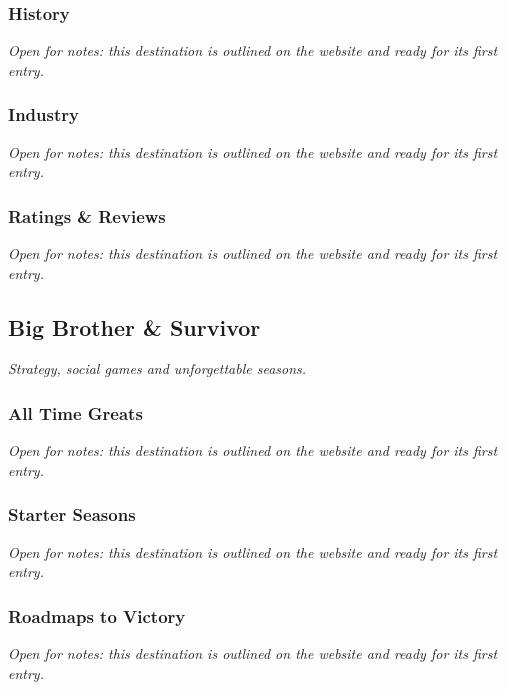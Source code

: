 \documentclass{article}
\begin{document}
\subsubsection{History}\label{sec:gaming-history}
\textit{Open for notes: this destination is outlined on the website and ready for its first entry.}

\subsubsection{Industry}\label{sec:industry}
\textit{Open for notes: this destination is outlined on the website and ready for its first entry.}

\subsubsection{Ratings \& Reviews}\label{sec:ratings-and-reviews}
\textit{Open for notes: this destination is outlined on the website and ready for its first entry.}

\subsection{Big Brother \& Survivor}\label{sec:big-brother-and-survivor}
\textit{Strategy, social games and unforgettable seasons.}

\subsubsection{All Time Greats}\label{sec:big-brother-and-survivor-all-time-greats}
\textit{Open for notes: this destination is outlined on the website and ready for its first entry.}

\subsubsection{Starter Seasons}\label{sec:starter-seasons}
\textit{Open for notes: this destination is outlined on the website and ready for its first entry.}

\subsubsection{Roadmaps to Victory}\label{sec:roadmaps-to-victory}
\textit{Open for notes: this destination is outlined on the website and ready for its first entry.}
\end{document}
